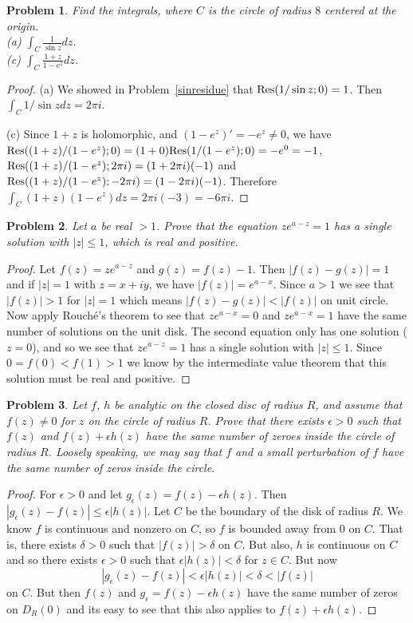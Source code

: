 \documentclass{article}
\newtheorem{problem}{Problem}
\newcommand{\res}{\textup{Res}}
\begin{document}
\begin{problem}
Find the integrals, where $C$ is the circle of radius $8$ centered at the origin.\\
(a) $\int_C \frac{1}{\sin z} dz$.\\
(c) $\int_C \frac{1+z}{1-e^z} dz$.
\end{problem}
\begin{proof}
(a) We showed in Problem~\ref{sinresidue} that $\res(1/\sin z ; 0) = 1$. Then $\int_C 1/\sin z dz = 2 \pi i$.

(c) Since $1 + z$ is holomorphic, and $(1-e^z)' = -e^z \neq 0$, we have $\res((1+z)/(1-e^z);0) = (1 + 0)\res(1/(1-e^z);0) = -e^0 = -1$, $\res((1+z)/(1-e^z); 2 \pi i) = (1+2\pi i)(-1)$ and $\res((1+z)/(1-e^z);-2 \pi i) = (1-2\pi i)(-1)$. Therefore $\int_C (1+z)(1-e^z)dz = 2 \pi i (-3) = -6 \pi i$.
\end{proof}

\begin{problem}
Let $a$ be real $> 1$. Prove that the equation $ze^{a-z} = 1$ has a single solution with $|z| \leq 1$, which is real and positive.
\end{problem}
\begin{proof}
Let $f(z) = ze^{a-z}$ and $g(z) = f(z) - 1$. Then $|f(z) - g(z)| = 1$ and if $|z| = 1$ with $z = x+iy$, we have $|f(z)| = e^{a-x}$. Since $a > 1$ we see that $|f(z)| > 1$ for $|z| = 1$ which means $|f(z)-g(z)| < |f(z)|$ on unit circle. Now apply Rouch\'{e}'s theorem to see that $ze^{a-x} = 0$ and $ze^{a-x} = 1$ have the same number of solutions on the unit disk. The second equation only has one solution ($z = 0$), and so we see that $ze^{a-z} = 1$ has a single solution with $|z| \leq 1$. Since $0 = f(0) < f(1) > 1$ we know by the intermediate value theorem that this solution must be real and positive.
\end{proof}

\begin{problem}
Let $f$, $h$ be analytic on the closed disc of radius $R$, and assume that $f(z) \neq 0$ for $z$ on the circle of radius $R$. Prove that there exists $\epsilon > 0$ such that $f(z)$ and $f(z) + \epsilon h(z)$ have the same number of zeroes inside the circle of radius $R$. Loosely speaking, we may say that $f$ and a small perturbation of $f$ have the same number of zeros inside the circle.
\end{problem}
\begin{proof}
For $\epsilon > 0$ and let $g_{\epsilon}(z) = f(z) - \epsilon h(z)$. Then $|g_{\epsilon}(z) - f(z)| \leq \epsilon |h(z)|$. Let $C$ be the boundary of the disk of radius $R$. We know $f$ is continuous and nonzero on $C$, so $f$ is bounded away from $0$ on $C$. That is, there exists $\delta > 0$ such that $|f(z)| > \delta$ on $C$. But also, $h$ is continuous on $C$ and so there exists $\epsilon > 0$ such that $\epsilon |h(z)| < \delta$ for $z \in C$. But now
\[
|g_{\epsilon}(z) - f(z)| < \epsilon |h(z)| < \delta < |f(z)|
\]
on $C$. But then $f(z)$ and $g_{\epsilon} = f(z) - \epsilon h(z)$ have the same number of zeros on $D_R(0)$ and its easy to see that this also applies to $f(z) + \epsilon h(z)$.
\end{proof}
\end{document}
